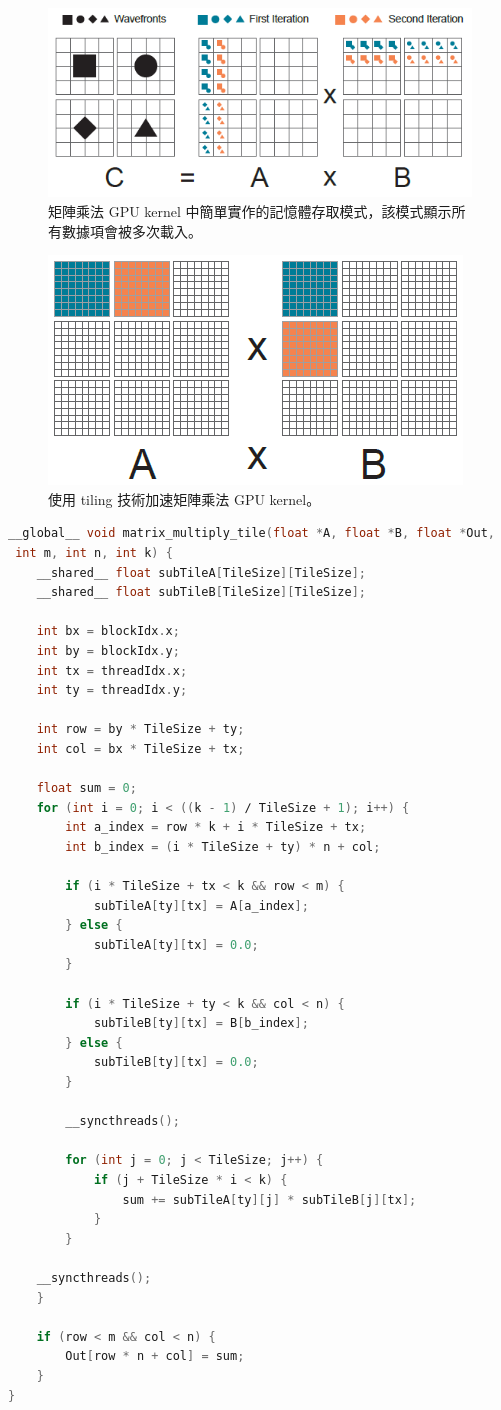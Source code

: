 \begin{figure}[h]
    \centering
    \includegraphics[width=0.7\linewidth]{FileAusiliari/Screenshots/Figure8-7.png}
    \caption{矩陣乘法 GPU kernel 中簡單實作的記憶體存取模式，該模式顯示所有數據項會被多次載入。}
    \label{fig:memory}
\end{figure}

\begin{figure}[h]
    \centering
    \includegraphics[width=0.6\linewidth]{FileAusiliari/Screenshots/Figure8-8.png}
    \caption{使用 tiling 技術加速矩陣乘法 GPU kernel。}
    \label{fig:tiling}
\end{figure}

\begin{lstlisting}[language=C, caption={基於 tiling 的 HIP kernel 用於矩陣乘法。}, captionpos=t, label={lst:tiling}]
__global__ void matrix_multiply_tile(float *A, float *B, float *Out,
 int m, int n, int k) {
    __shared__ float subTileA[TileSize][TileSize];
    __shared__ float subTileB[TileSize][TileSize];

    int bx = blockIdx.x;
    int by = blockIdx.y;
    int tx = threadIdx.x;
    int ty = threadIdx.y;

    int row = by * TileSize + ty;
    int col = bx * TileSize + tx;

    float sum = 0;
    for (int i = 0; i < ((k - 1) ∕ TileSize + 1); i++) {
        int a_index = row * k + i * TileSize + tx;
        int b_index = (i * TileSize + ty) * n + col;

        if (i * TileSize + tx < k && row < m) {
            subTileA[ty][tx] = A[a_index];
        } else {
            subTileA[ty][tx] = 0.0;
        }

        if (i * TileSize + ty < k && col < n) {
            subTileB[ty][tx] = B[b_index];
        } else {
            subTileB[ty][tx] = 0.0;
        }

        __syncthreads();

        for (int j = 0; j < TileSize; j++) {
            if (j + TileSize * i < k) {
                sum += subTileA[ty][j] * subTileB[j][tx];
            }
        }

    __syncthreads();
    }

    if (row < m && col < n) {
        Out[row * n + col] = sum;
    }
}
\end{lstlisting}


